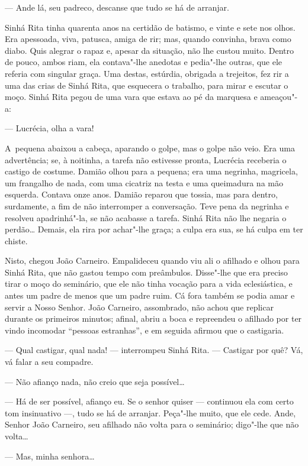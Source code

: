 \begin{linenumbers}
--- Ande lá, seu padreco, descanse que tudo se há de arranjar.

Sinhá Rita tinha quarenta anos na certidão de batismo, e vinte e sete
nos olhos. Era apessoada, viva, patusca, amiga de rir; mas, quando
convinha, brava como diabo. Quis alegrar o rapaz e, apesar da situação,
não lhe custou muito. Dentro de pouco, ambos riam, ela contava"-lhe
anedotas e pedia"-lhe outras, que ele referia com singular graça. Uma
destas, estúrdia, obrigada a trejeitos, fez rir a uma das crias de Sinhá
Rita, que esquecera o trabalho, para mirar e escutar o moço. Sinhá Rita
pegou de uma vara que estava ao pé da marquesa e ameaçou"-a:

--- Lucrécia, olha a vara!

A~pequena abaixou a cabeça, aparando o golpe, mas o golpe não veio. Era
uma advertência; se, à noitinha, a tarefa não estivesse pronta, Lucrécia
receberia o castigo de costume. Damião olhou para a pequena; era uma
negrinha, magricela, um frangalho de nada, com uma cicatriz na testa e
uma queimadura na mão esquerda. Contava onze anos. Damião reparou que
tossia, mas para dentro, surdamente, a fim de não interromper a
conversação. Teve pena da negrinha e resolveu apadrinhá"-la, se não
acabasse a tarefa. Sinhá Rita não lhe negaria o perdão\ldots{} Demais, ela
rira por achar"-lhe graça; a culpa era sua, se há culpa em ter chiste.

Nisto, chegou João Carneiro. Empalideceu quando viu ali o afilhado e
olhou para Sinhá Rita, que não gastou tempo com preâmbulos. Disse"-lhe
que era preciso tirar o moço do seminário, que ele não tinha vocação
para a vida eclesiástica, e antes um padre de menos que um padre ruim.
Cá fora também se podia amar e servir a Nosso Senhor. João Carneiro,
assombrado, não achou que replicar durante os primeiros minutos; afinal,
abriu a boca e repreendeu o afilhado por ter vindo incomodar ``pessoas
estranhas'', e em seguida afirmou que o castigaria.

--- Qual castigar, qual nada! --- interrompeu Sinhá Rita. --- Castigar por
quê? Vá, vá falar a seu compadre.

--- Não afianço nada, não creio que seja possível\ldots{}

--- Há de ser possível, afianço eu. Se o senhor quiser --- continuou
ela com certo tom insinuativo ---, tudo se há de arranjar. Peça"-lhe
muito, que ele cede. Ande, Senhor João Carneiro, seu afilhado não volta
para o seminário; digo"-lhe que não volta\ldots{}

--- Mas, minha senhora\ldots{}


\end{linenumbers}
